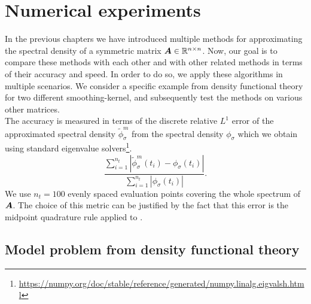 \chapter{Numerical experiments}
\label{chp:5-experiments}

In the previous chapters we have introduced multiple methods for approximating the
spectral density of a symmetric matrix $\boldsymbol{A} \in \mathbb{R}^{n \times n}$. Now,
our goal is to compare these methods with each other and with other related methods
in terms of their accuracy and speed. In order to do so, we apply these algorithms
in multiple scenarios. We consider a specific example from density functional theory
\cite{lin2017randomized} for two different \gls{smoothing-kernel}, and
subsequently test the methods on various other matrices.\\

The accuracy is measured in terms of the discrete relative $L^1$ error of the approximated
spectral density $\tilde{\phi}_{\sigma}^m$ from the spectral density $\phi_{\sigma}$
which we obtain using standard eigenvalue solvers\footnote{\url{https://numpy.org/doc/stable/reference/generated/numpy.linalg.eigvalsh.html}}.
\begin{equation}
    \frac{\sum_{i=1}^{n_t} |\widetilde{\phi}_{\sigma}^m(t_i) - \phi_{\sigma}(t_i)|}{\sum_{i=1}^{n_t} |\phi_{\sigma}(t_i)|}.
    \label{equ:5-experiments-L1-error}
\end{equation}
We use $n_t=100$ evenly spaced evaluation points covering the whole spectrum of
$\boldsymbol{A}$. The choice of this metric can be justified by the fact that this
error is the midpoint quadrature rule applied to  \cite[Chapter~9.2.1]{quarteroni2007numerical}. 


\section{Model problem from density functional theory}
\label{sec:5-experiments-density-function}

